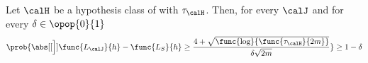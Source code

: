 \begin{theorem}
    Let \(\calH\) be a hypothesis class of with \(\tau_{\calH}\). Then, for every \(\calJ\) and for every \(\delta \in \opop{0}{1}\)
    \begin{equation*}
        \prob{\abs[[\Big]]{\func{L_{\calJ}}{h} - \func{L_S}{h}} \geq \dfrac{4 + \sqrt{\func{\log}{\func{\tau_{\calH}}{2m}}}}{\delta \sqrt{2m}}} \geq 1 - \delta
    \end{equation*}
\end{theorem}